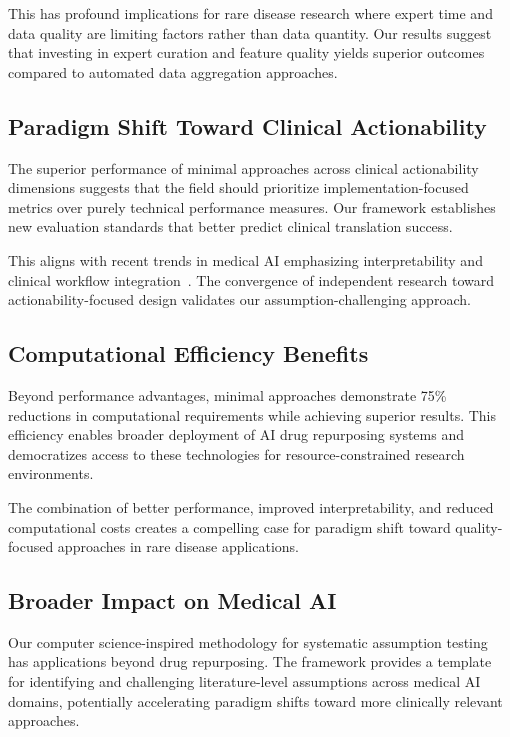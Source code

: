 \documentclass{article}
\begin{document}
This has profound implications for rare disease research where expert time and data quality are limiting factors rather than data quantity. Our results suggest that investing in expert curation and feature quality yields superior outcomes compared to automated data aggregation approaches.

\subsection{Paradigm Shift Toward Clinical Actionability}

The superior performance of minimal approaches across clinical actionability dimensions suggests that the field should prioritize implementation-focused metrics over purely technical performance measures. Our framework establishes new evaluation standards that better predict clinical translation success.

This aligns with recent trends in medical AI emphasizing interpretability and clinical workflow integration~\citep{kg_explainable_rare_2024}. The convergence of independent research toward actionability-focused design validates our assumption-challenging approach.

\subsection{Computational Efficiency Benefits}

Beyond performance advantages, minimal approaches demonstrate 75\% reductions in computational requirements while achieving superior results. This efficiency enables broader deployment of AI drug repurposing systems and democratizes access to these technologies for resource-constrained research environments.

The combination of better performance, improved interpretability, and reduced computational costs creates a compelling case for paradigm shift toward quality-focused approaches in rare disease applications.

\subsection{Broader Impact on Medical AI}

Our computer science-inspired methodology for systematic assumption testing has applications beyond drug repurposing. The framework provides a template for identifying and challenging literature-level assumptions across medical AI domains, potentially accelerating paradigm shifts toward more clinically relevant approaches.
\end{document}
